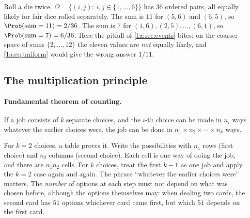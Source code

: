 \label{1a:ex:two-dice}
Roll a die twice. $\Omega=\{(i,j):\ i,j\in\{1,\dots,6\}\}$ has $36$ ordered pairs,
all equally likely for fair dice rolled separately. The sum is $11$ for
$(5,6)$ and $(6,5)$, so $\Prob(\text{sum}=11)=2/36$. The sum is $7$ for $(1,6),(2,5),
\dots,(6,1)$, so $\Prob(\text{sum}=7)=6/36$. Here the pitfall of
\cref{1a:sec:events} bites: on the coarser space of sums $\{2,\dots,12\}$ the
eleven values are \emph{not} equally likely, and \eqref{1a:eq:uniform} would give
the wrong answer $1/11$.

\subsection{The multiplication principle}

\paragraph{Fundamental theorem of counting.}
If a job consists of $k$ separate choices, and the $i$-th choice can be made in
$n_i$ ways whatever the earlier choices were, the job can be done in
$n_1\times n_2\times\cdots\times n_k$ ways.

For $k=2$ choices, a table proves it. Write the possibilities with $n_1$ rows
(first choice) and $n_2$ columns (second choice). Each cell is one way of doing
the job, and there are $n_1n_2$ cells. For $k$ choices, treat the first $k-1$ as
one job and apply the $k=2$ case again and again. The phrase ``whatever the
earlier choices were'' matters. The \emph{number} of options at each step must
not depend on what was chosen before, although the options themselves may: when
dealing two cards, the second card has $51$ options whichever card came first,
but which $51$ depends on the first card.

